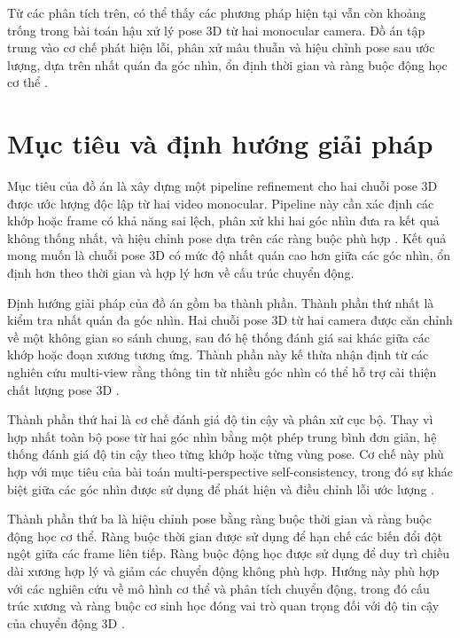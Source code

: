 \documentclass[../DoAn.tex]{subfiles}
\begin{document}
Từ các phân tích trên, có thể thấy các phương pháp hiện tại vẫn còn khoảng trống trong bài toán hậu xử lý pose 3D từ hai monocular camera. Đồ án tập trung vào cơ chế phát hiện lỗi, phân xử mâu thuẫn và hiệu chỉnh pose sau ước lượng, dựa trên nhất quán đa góc nhìn, ổn định thời gian và ràng buộc động học cơ thể \cite{vu2026multiperspective}.

\section{Mục tiêu và định hướng giải pháp}
\label{sec:muctieu}

Mục tiêu của đồ án là xây dựng một pipeline refinement cho hai chuỗi pose 3D được ước lượng độc lập từ hai video monocular. Pipeline này cần xác định các khớp hoặc frame có khả năng sai lệch, phân xử khi hai góc nhìn đưa ra kết quả không thống nhất, và hiệu chỉnh pose dựa trên các ràng buộc phù hợp \cite{vu2026multiperspective}. Kết quả mong muốn là chuỗi pose 3D có mức độ nhất quán cao hơn giữa các góc nhìn, ổn định hơn theo thời gian và hợp lý hơn về cấu trúc chuyển động.

Định hướng giải pháp của đồ án gồm ba thành phần. Thành phần thứ nhất là kiểm tra nhất quán đa góc nhìn. Hai chuỗi pose 3D từ hai camera được căn chỉnh về một không gian so sánh chung, sau đó hệ thống đánh giá sai khác giữa các khớp hoặc đoạn xương tương ứng. Thành phần này kế thừa nhận định từ các nghiên cứu multi-view rằng thông tin từ nhiều góc nhìn có thể hỗ trợ cải thiện chất lượng pose 3D \cite{canonpose2021,mtftransformer2023,gu2024multiview}.

Thành phần thứ hai là cơ chế đánh giá độ tin cậy và phân xử cục bộ. Thay vì hợp nhất toàn bộ pose từ hai góc nhìn bằng một phép trung bình đơn giản, hệ thống đánh giá độ tin cậy theo từng khớp hoặc từng vùng pose. Cơ chế này phù hợp với mục tiêu của bài toán multi-perspective self-consistency, trong đó sự khác biệt giữa các góc nhìn được sử dụng để phát hiện và điều chỉnh lỗi ước lượng \cite{vu2026multiperspective}.

Thành phần thứ ba là hiệu chỉnh pose bằng ràng buộc thời gian và ràng buộc động học cơ thể. Ràng buộc thời gian được sử dụng để hạn chế các biến đổi đột ngột giữa các frame liên tiếp. Ràng buộc động học được sử dụng để duy trì chiều dài xương hợp lý và giảm các chuyển động không phù hợp. Hướng này phù hợp với các nghiên cứu về mô hình cơ thể và phân tích chuyển động, trong đó cấu trúc xương và ràng buộc cơ sinh học đóng vai trò quan trọng đối với độ tin cậy của chuyển động 3D \cite{keller2023skin,delp2007opensim,uhlrich2023opencap}.
\end{document}
